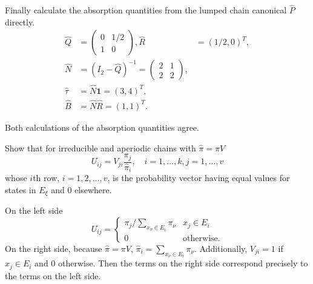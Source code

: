 \documentclass[12pt]{article}
\begin{document}
\begin{solution}
    Finally calculate the absorption quantities from the lumped chain
    canonical \( \hat{P} \) directly.
    \begin{align*}
        \hat{Q} &=
        \begin{pmatrix}
            0 & 1/2 \\
            1 & 0
        \end{pmatrix}
        , \hat{R} &= (1/2, 0)^T, \\
        \hat{N} &= (I_2 - \hat{Q})^{-1} =
        \begin{pmatrix}
            2 & 1 \\
            2 & 2
        \end{pmatrix}
        , \\
        \hat{\tau} &= \hat{N} \mathbf{1} = (3,4)^T, \\
        \hat{B} &= \hat{N} \hat{R} = (1,1)^T.
    \end{align*}

    Both calculations of the absorption quantities agree.
\end{solution}

\begin{exercise}
    Show that for irreducible and aperiodic chains with \( \hat{\pi} =
    \pi V \)
    \[
        U_{ij} = V_{ji} \frac{\pi_j}{\hat{\pi}_{i}}, \quad i = 1, \dots,
        k, j = 1, \dots, v
    \] whose \( i \)th row, \( i = 1, 2, \dots, v \), is the probability
    vector having equal values for states in \( E_{\xi} \) and \( 0 \)
    elsewhere.
\end{exercise}
\begin{solution}
    On the left side
    \[
        U_{ij} =
        \begin{cases}
            \pi_j/\sum_{x_{\nu} \in E_i} \pi_\nu & x_j \in E_i \\
            0 & \text{otherwise}.
        \end{cases}
    \] On the right side, because \( \hat{\pi} = \pi V \), \( \hat{\pi}_i
    = \sum_{x_{\nu} \in E_i} \pi_{\nu} \).  Additionally, \( V_{ji} = 1 \)
    if \( x_j \in E_i \) and \( 0 \) otherwise.  Then the terms on the
    right side correspond precisely to the terms on the left side.
\end{solution}
\end{document}

